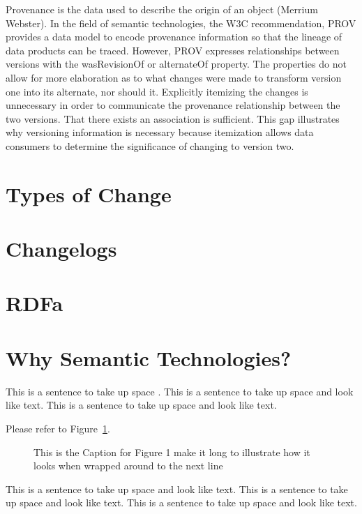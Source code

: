 Provenance is the data used to describe the origin of an object (Merrium Webster).  In the field of semantic technologies, the W3C recommendation, PROV provides a data model to encode provenance information so that the lineage of data products can be traced.  However, PROV expresses relationships between versions with the wasRevisionOf or alternateOf property.  The properties do not allow for more elaboration as to what changes were made to transform version one into its alternate, nor should it.  Explicitly itemizing the changes is unnecessary in order to communicate the provenance relationship between the two versions.  That there exists an association is sufficient.  This gap illustrates why versioning information is necessary because itemization allows data consumers to determine the significance of changing to version two.

\section{Types of Change}

\section{Changelogs}

\section{RDFa}

\section{Why Semantic Technologies?}

This is a sentence to take up space \cite{thisbook}.
This is a sentence to take up space and look like text.
This is a sentence to take up space and look like text.

Please refer to Figure~\ref{myfig}.  %

\begin{figure}
\centering
\vspace{2.0in} %
\caption{This is the Caption for Figure 1 make it long to illustrate
how it looks when wrapped around to the next line}
\label{myfig}  %
\end{figure}

This is a sentence to take up space and look like text.
This is a sentence to take up space and look like text.
This is a sentence to take up space and look like text.

